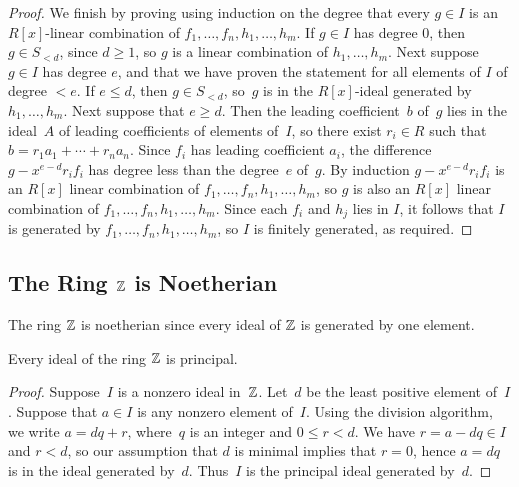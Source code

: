 \begin{proof}
We finish by proving using induction on the degree that every $g\in I$ is an
$R[x]$-linear combination of $f_1,\ldots, f_n, h_1,\ldots, h_m$.
If $g\in I$ has degree $0$, then $g \in S_{<d}$, since $d\geq 1$, so
$g$ is a linear combination of $h_1,\ldots, h_m$.  Next suppose
$g\in I$ has degree $e$, and that we have proven the statement
for all elements of $I$ of degree $<e$.
If $e\leq d$, then $g\in S_{<d}$, so~$g$ is
in the $R[x]$-ideal generated by $h_1,\ldots, h_m$.  Next suppose
that $e\geq d$.  Then the leading coefficient~$b$
of~$g$ lies in the ideal~$A$ of leading coefficients of elements of~$I$, so there
exist $r_i\in R$ such that $b=r_1 a_1 + \cdots + r_n a_n$.  Since
$f_i$ has leading coefficient $a_i$, the difference $g- x^{e-d} r_i
f_i$ has degree less than the degree~$e$ of~$g$.  By induction $g-
x^{e-d} r_i f_i$ is an $R[x]$ linear combination of $f_1,\ldots, f_n,
h_1,\ldots, h_m$, so $g$ is also an $R[x]$ linear combination of
$f_1,\ldots, f_n, h_1,\ldots, h_m$.  Since each $f_i$ and $h_j$ lies in
$I$, it follows that $I$ is generated by $f_1,\ldots, f_n, h_1,\ldots,
h_m$, so $I$ is finitely generated, as required.
\end{proof}

\subsection{The Ring $\mathbb{Z}$ is Noetherian}\label{sec:Znoeth}

The ring $\mathbb{Z}$ is noetherian since every ideal of $\mathbb{Z}$ is
generated by one element.
\begin{proposition}\label{prop:zpid}
	Every ideal of the ring $\mathbb{Z}$ is principal.
\end{proposition}
\begin{proof}
	Suppose~$I$ is a nonzero ideal in~$\mathbb{Z}$. Let~$d$ be the least positive
	element of~$I$.  Suppose that $a\in I$ is any nonzero element of~$I$.
	Using the division algorithm, we write $a=dq + r$, where~$q$ is an
	integer and $0\leq r < d$.  We have $r=a-dq\in I$ and $r<d$, so our
	assumption that $d$ is minimal implies that $r=0$, hence $a=dq$ is in
	the ideal generated by~$d$. Thus~$I$ is the principal ideal generated
	by~$d$.
\end{proof}

